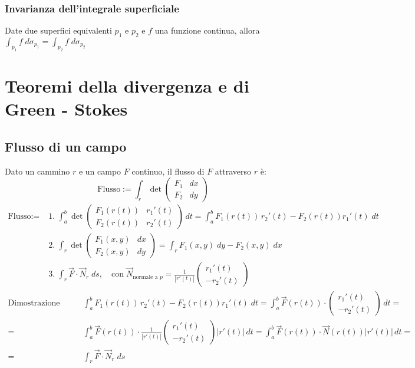 \documentclass[a4paper]{article}
\begin{document}
\subsubsection*{Invarianza dell'integrale superficiale}
Date due superfici equivalenti \(p_1\) e \(p_2\) e \(f\) una funzione continua, allora \(\displaystyle \int_{p_1} f \; d\sigma_{p_1} = \int_{p_2} f \; d\sigma_{p_2}\)

\newpage


\section{Teoremi della divergenza e di Green - Stokes}
\subsection{Flusso di un campo}
Dato un cammino \(r\) e un campo \(F\) continuo, il flusso di \(F\) attraverso \(r\) è:
\[\text{Flusso} := \int_r \det \left(\begin{matrix} F_1 & dx \\ F_2 & dy \end{matrix}\right)\]
\begin{align*}
	\text{Flusso} := \; &1. \;\int_a^b \det \left(\begin{matrix} F_1(r(t)) & r_1'(t) \\[3pt] F_2(r(t)) & r_2'(t) \end{matrix}\right) \, dt = \int_a^b F_1(r(t)) \, r_2'(t) - F_2(r(t)) r_1'(t) \; dt \\
	&2. \; \int_r \det \left(\begin{matrix} F_1(x,y) & dx \\[3pt] F_2(x,y) & dy \end{matrix}\right) = \int_r F_1(x,y) \; dy - F_2(x,y) \; dx \\
	&3. \; \int_r \vec{F} \cdot \vec{N}_r \; ds, \quad \text{con} \; \vec{N}_\text{normale a \(p\)} = \frac{1}{\left|r'(t)\right|} \left(\begin{matrix} r_1'(t) \\ -r_2'(t) \end{matrix}\right)
\end{align*}
\begin{align*}
	\text{Dimostrazione punto 3:} \qquad &\int_a^b F_1(r(t)) \, r_2'(t) - F_2(r(t)) r_1'(t) \; dt = \int_a^b \vec{F}(r(t)) \cdot \left(\begin{matrix} r_1'(t) \\ -r_2'(t) \end{matrix}\right) \, dt = \\
	= &\int_a^b \vec{F}(r(t)) \cdot \frac{1}{\left|r'(t)\right|} \left(\begin{matrix} r_1'(t) \\ -r_2'(t) \end{matrix}\right) \left|r'(t)\right| \, dt = \int_a^b \vec{F}(r(t)) \cdot \vec{N}(r(t)) \left|r'(t)\right| \, dt = \\
	= &\int_r \vec{F} \cdot \vec{N}_r \; ds
\end{align*}
\end{document}
